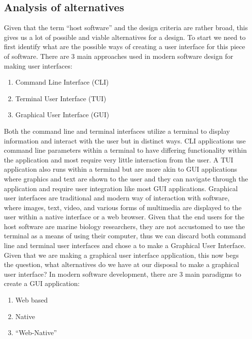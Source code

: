 \documentclass[12pt]{article}
\begin{document}
\subsection{Analysis of alternatives}
Given that the term ``host software'' and the design criteria are rather broad, this gives us a lot of possible and viable alternatives for a design. To start we need to first identify what are the possible ways of creating a user interface for this piece of software. There are 3 main approaches used in modern software design for making user interfaces:
\begin{enumerate}
	\item Command Line Interface (CLI)
	\item Terminal User Interface (TUI)
	\item Graphical User Interface (GUI)
\end{enumerate}
Both the command line and terminal interfaces utilize a terminal to display information and interact with the user but in distinct ways. CLI applications use command line parameters within a terminal to have differing functionality within the application and most require very little interaction from the user. A TUI application also runs within a terminal but are more akin to GUI applications where graphics and text are shown to the user and they can navigate through the application and require user integration like most GUI applications. Graphical user interfaces are traditional and modern way of interaction with software, where images, text, video, and various forms of multimedia are displayed to the user within a native interface or a web browser. Given that the end users for the host software are marine biology researchers, they are not accustomed to use the terminal as a means of using their computer, thus we can discard both command line and terminal user interfaces and chose a to make a Graphical User Interface.\\
Given that we are making a graphical user interface application, this now begs the question, what alternatives do we have at our disposal to make a graphical user interface? In modern software development, there are 3 main paradigms to create a GUI application:
\begin{enumerate}
	\item Web based
	\item Native
	\item ``Web-Native''
\end{enumerate}
\end{document}
